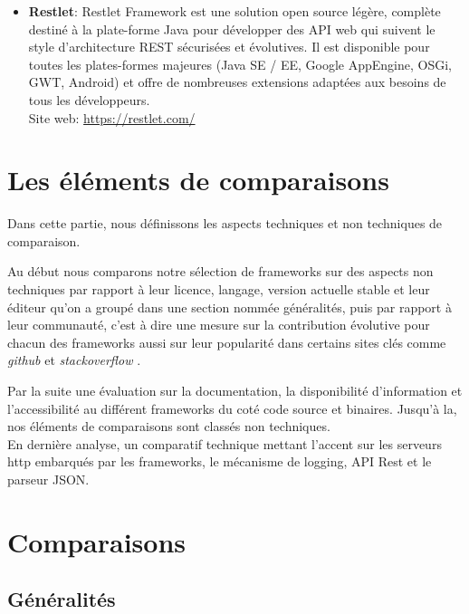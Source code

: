 \documentclass[12pt, a4paper, openany]{report}
\begin{document}
\begin{itemize}
      \item \textbf{Restlet}: Restlet Framework est une solution open source légère, complète destiné à  la plate-forme Java pour développer des API web qui suivent le style d'architecture REST sécurisées et évolutives. Il est disponible pour toutes les plates-formes majeures (Java SE / EE, Google AppEngine, OSGi, GWT, Android) et offre de nombreuses extensions adaptées aux besoins de tous les développeurs. \\
      Site web: \url{https://restlet.com/}
      
   \end{itemize}
   
   
   
 \section{Les éléments de comparaisons}
 
  Dans cette partie, nous définissons les aspects techniques et non techniques de comparaison.
 
  Au début nous comparons notre sélection de frameworks sur des aspects non techniques par rapport à leur licence, langage, version actuelle stable et leur éditeur qu'on a groupé dans une section nommée généralités, puis par rapport à leur communauté, c'est à dire une mesure sur la contribution évolutive pour chacun des frameworks aussi sur leur popularité dans certains sites clés comme \textit{github} et \textit{stackoverflow} .
  
   Par la suite une évaluation sur la documentation, la disponibilité d'information et l'accessibilité au différent frameworks du coté code source et binaires. Jusqu’à la, nos éléments de comparaisons sont classés non techniques.   \\
  
  En dernière analyse, un comparatif technique mettant l'accent sur les serveurs http embarqués par les frameworks, le mécanisme de logging, API Rest et le parseur JSON.\\
 
 \section{Comparaisons}
  
  \subsection{Généralités}
   
\end{document}
